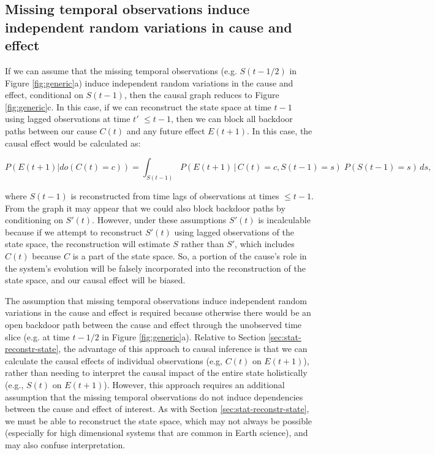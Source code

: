 \documentclass[12pt]{article}
\begin{document}
\subsection{Missing temporal observations induce independent random
  variations in cause and effect}
\label{sec:miss-temp-observ}

If we can assume that the missing temporal observations
(e.g. $S(t-1/2)$ in Figure \ref{fig:generic}a) induce independent
random variations in the cause and effect, conditional on $S(t-1)$,
then the causal graph reduces to Figure \ref{fig:generic}c. In this
case, if we can reconstruct the state space at time $t-1$ using lagged
observations at time $t'$ $\leq t-1$, then we can block all backdoor
paths between our cause $C(t)$ and any future effect $E(t+1)$. In this
case, the causal effect would be calculated as:

\begin{equation} P(E(t+1)| do(C(t)=c)) = \int_{S(t-1)} P(E(t+1) \, |
  \, C(t)=c, S(t-1) = s )\; P(S(t-1)=s) \, d s,
\end{equation}

where $S(t-1)$ is reconstructed from time lags of observations at
times $\leq t-1$. From the graph it may appear that we could also
block backdoor paths by conditioning on $S'(t)$. However, under these
assumptions $S'(t)$ is incalculable because if we attempt to
reconstruct $S'(t)$ using lagged observations of the state space, the
reconstruction will estimate $S$ rather than $S'$, which includes
$C(t)$ because $C$ is a part of the state space. So, a portion of the
cause's role in the system's evolution will be falsely incorporated
into the reconstruction of the state space, and our causal effect will
be biased.

The assumption that missing temporal observations induce independent
random variations in the cause and effect is required because
otherwise there would be an open backdoor path between the cause and
effect through the unobserved time slice (e.g. at time $t-1/2$ in
Figure \ref{fig:generic}a). Relative to Section
\ref{sec:stat-reconstr-state}, the advantage of this approach to
causal inference is that we can calculate the causal effects of
individual observations (e.g, $C(t)$ on $E(t+1)$), rather than needing
to interpret the causal impact of the entire state holistically (e.g.,
$S(t)$ on $E(t+1)$). However, this approach requires an additional
assumption that the missing temporal observations do not induce
dependencies between the cause and effect of interest. As with Section
\ref{sec:stat-reconstr-state}, we must be able to reconstruct the
state space, which may not always be possible (especially for high
dimensional systems that are common in Earth science), and may also
confuse interpretation.
\end{document}
